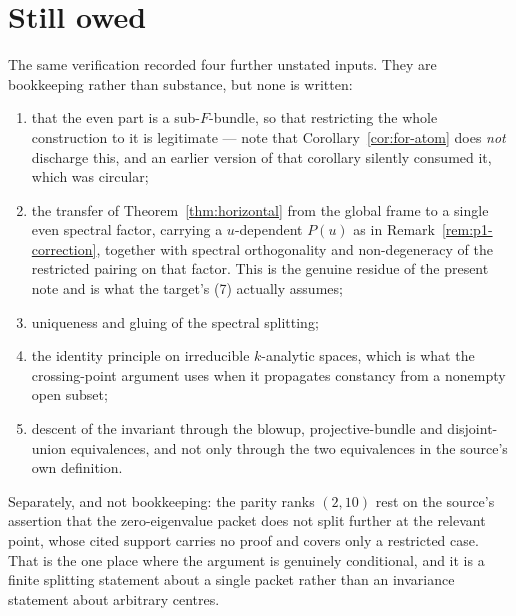 \documentclass[11pt]{article}
\theoremstyle{definition}
\theoremstyle{remark}
\begin{document}
\section{Still owed}

The same verification recorded four further unstated inputs. They are
bookkeeping rather than substance, but none is written:

\begin{enumerate}[label=(\roman*)]
\item that the even part is a sub-$F$-bundle, so that restricting the whole
  construction to it is legitimate --- note that
  Corollary~\ref{cor:for-atom} does \emph{not} discharge this, and an earlier
  version of that corollary silently consumed it, which was circular;
\item[(i$'$)] the transfer of Theorem~\ref{thm:horizontal} from the global frame
  to a single even spectral factor, carrying a $u$-dependent $P(u)$ as in
  Remark~\ref{rem:p1-correction}, together with spectral orthogonality and
  non-degeneracy of the restricted pairing on that factor. This is the genuine
  residue of the present note and is what the target's (7) actually assumes;
\item uniqueness and gluing of the spectral splitting;
\item the identity principle on irreducible $k$-analytic spaces, which is what
  the crossing-point argument uses when it propagates constancy from a nonempty
  open subset;
\item descent of the invariant through the blowup, projective-bundle and
  disjoint-union equivalences, and not only through the two equivalences in the
  source's own definition.
\end{enumerate}

Separately, and not bookkeeping: the parity ranks $(2,10)$ rest on the source's
assertion that the zero-eigenvalue packet does not split further at the relevant
point, whose cited support carries no proof and covers only a restricted case.
That is the one place where the argument is genuinely conditional, and it is a
finite splitting statement about a single packet rather than an invariance
statement about arbitrary centres.
\end{document}
